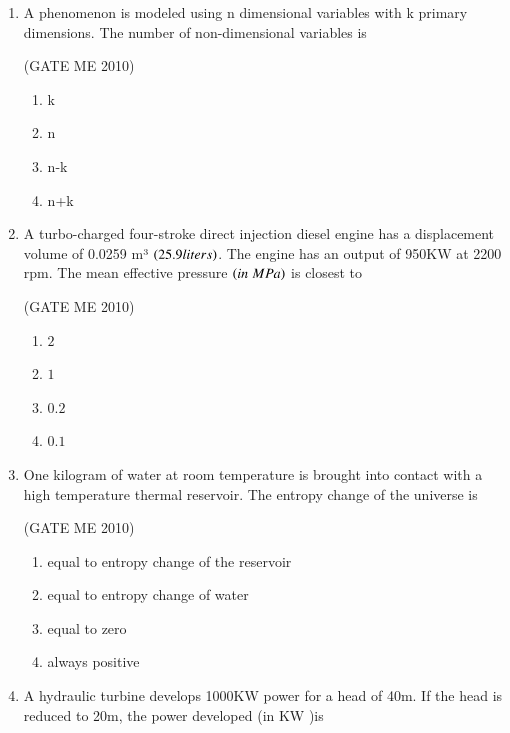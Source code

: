 \documentclass[journal,12pt,onecolumn]{IEEEtran}
\theoremstyle{remark}
\begin{document}
\begin{enumerate}
\item A phenomenon is modeled using n dimensional variables with k primary dimensions. The number of non-dimensional variables is

 \hfill{(GATE ME 2010)}

\begin{multicols}{4}
    \begin{enumerate}
        \item k
        \item n
        \item n-k
        \item n+k
    \end{enumerate}
\end{multicols}

\item A turbo-charged four-stroke direct injection diesel engine has a displacement volume of 0.0259 m³ $\left(25.9 liters\right)$. The engine has an output of 950KW at 2200 rpm. The mean effective pressure $\left(in\;MPa\right)$ is closest to

 \hfill{(GATE ME 2010)}
\begin{multicols}{4}
    \begin{enumerate}
        \item $2$
        \item $1$
        \item $0.2$
        \item $0.1$
    \end{enumerate}
\end{multicols}


\item One kilogram of water at room temperature is brought into contact with a high temperature thermal reservoir. The entropy change of the universe is

 \hfill{(GATE ME 2010)}
 
    \begin{enumerate}
        \item equal to entropy change of the reservoir
\item equal to entropy change of water
\item equal to zero
\item always positive
    \end{enumerate}
 

\item A hydraulic turbine develops 1000KW power for a head of 40m. If the head is reduced to 20m, the power developed (in KW )is



\end{enumerate}
\end{document}
